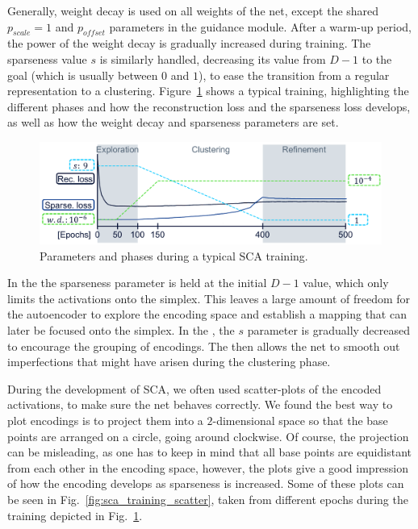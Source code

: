 			Generally, weight decay is used on all weights of the net, except the shared $p_{scale} = 1$ and $p_{offset}$ parameters in the guidance module.
			After a warm-up period, the power of the weight decay is gradually increased during training.
			The sparseness value $s$ is similarly handled, decreasing its value from $D-1$ to the goal (which is usually between $0$ and $1$), to ease the transition from a regular representation to a clustering.
			Figure~\ref{fig:sca_training} shows a typical training, highlighting the different phases and how the reconstruction loss and the sparseness loss develops, as well as how the weight decay and sparseness parameters are set.
			
			\begin{figure}[ht]
				\centering
				\includegraphics[width=0.8\linewidth]{figures/06_sparse_clust/sca_training/sca_training.pdf}
				\caption[Parameters and phases during a typical SCA training]{Parameters and phases during a typical SCA training.}
				\label{fig:sca_training}
			\end{figure}
			
			In the  the sparseness parameter is held at the initial $D-1$ value, which only limits the activations onto the simplex.
			This leaves a large amount of freedom for the autoencoder to explore the encoding space and establish a mapping that can later be focused onto the simplex.
			In the , the $s$ parameter is gradually decreased to encourage the grouping of encodings.
			The  then allows the net to smooth out imperfections that might have arisen during the clustering phase.
			
			During the development of \ac{SCA}, we often used scatter-plots of the encoded activations, to make sure the net behaves correctly.
			We found the best way to plot encodings is to project them into a $2$-dimensional space so that the base points are arranged on a circle, going around clockwise.
			Of course, the projection can be misleading, as one has to keep in mind that all base points are equidistant from each other in the encoding space, however, the plots give a good impression of how the encoding develops as sparseness is increased.
			Some of these plots can be seen in Fig.~\ref{fig:sca_training_scatter}, taken from different epochs during the training depicted in Fig.~\ref{fig:sca_training}.
			
